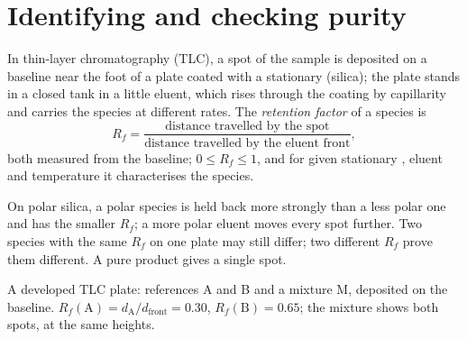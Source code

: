 \section{Identifying and checking purity}

\begin{definition}\label{def:b1:lab-techniques-1:retention-factor}
In thin-layer chromatography (TLC), a spot of the sample is deposited on
a baseline near the foot of a plate coated with a stationary 
(silica); the plate stands in a closed tank in a little eluent, which
rises through the coating by capillarity and carries the species at
different rates. The \emph{retention factor} of a
species is
\[
  R_f = \frac{\text{distance travelled by the spot}}
             {\text{distance travelled by the eluent front}},
\]
both measured from the baseline; $0 \le R_f \le 1$, and for given
stationary , eluent and temperature it characterises the species.
\end{definition}

On polar silica, a polar species is held back more strongly than a less
polar one and has the smaller $R_f$; a more polar eluent moves every spot
further. Two species with the same $R_f$ on one plate may still differ;
two different $R_f$ prove them different. A pure product gives a single
spot.

\begin{omfigure}

{\small A developed TLC plate: references A and B and a mixture M,
deposited on the baseline. $R_f(\mathrm{A}) = d_{\mathrm{A}}/d_{\mathrm{front}}
= 0.30$, $R_f(\mathrm{B}) = 0.65$; the mixture shows both spots, at the
same heights.}
\end{omfigure}

